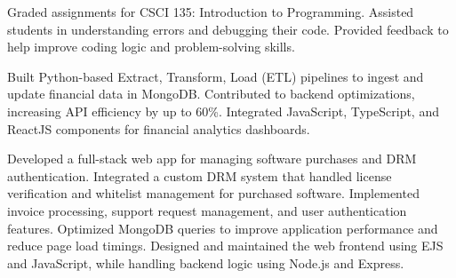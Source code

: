 \documentclass{resume}
\begin{document}
\begin{rExperience}
{Graded assignments for CSCI 135: Introduction to Programming.}
{Assisted students in understanding errors and debugging their code.}
{Provided feedback to help improve coding logic and problem-solving skills.}
{}
{}


{Built Python-based Extract, Transform, Load (ETL) pipelines to ingest and update financial data in MongoDB.}
{Contributed to backend optimizations, increasing API efficiency by up to 60\%.}
{Integrated JavaScript, TypeScript, and ReactJS components for financial analytics dashboards.}
{}
{}


{Developed a full-stack web app for managing software purchases and DRM authentication.}
{Integrated a custom DRM system that handled license verification and whitelist management for purchased software.}
{Implemented invoice processing, support request management, and user authentication features.}
{Optimized MongoDB queries to improve application performance and reduce page load timings.}
{Designed and maintained the web frontend using EJS and JavaScript, while handling backend logic using Node.js and Express.}

\end{rExperience}


\begin{rPublications}



\end{rPublications}
\end{document}
